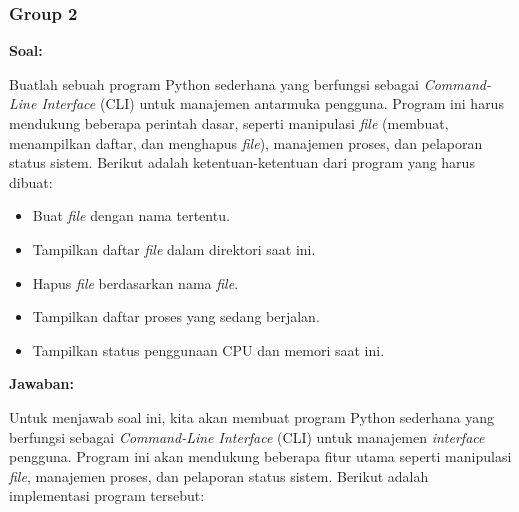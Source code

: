 \documentclass[12pt]{article}
\begin{document}
\subsubsection{Group 2}
\textbf{Soal:}
\par Buatlah sebuah program Python sederhana yang berfungsi sebagai \textit{Command-Line Interface} (CLI) untuk manajemen antarmuka pengguna. Program ini harus mendukung beberapa perintah dasar, seperti manipulasi \textit{file} (membuat, menampilkan daftar, dan menghapus \textit{file}), manajemen proses, dan pelaporan status sistem. Berikut adalah ketentuan-ketentuan dari program yang harus dibuat:
\begin{itemize}
    \item Buat \textit{file} dengan nama tertentu.
    \item Tampilkan daftar \textit{file} dalam direktori saat ini.
    \item Hapus \textit{file} berdasarkan nama \textit{file}.
    \item Tampilkan daftar proses yang sedang berjalan.
    \item Tampilkan status penggunaan CPU dan memori saat ini.
\end{itemize}
\textbf{Jawaban:}
\par Untuk menjawab soal ini, kita akan membuat program Python sederhana yang berfungsi sebagai \textit{Command-Line Interface} (CLI) untuk manajemen \textit{interface} pengguna. Program ini akan mendukung beberapa fitur utama seperti manipulasi \textit{file}, manajemen proses, dan pelaporan status sistem. Berikut adalah implementasi program tersebut:
\end{document}
